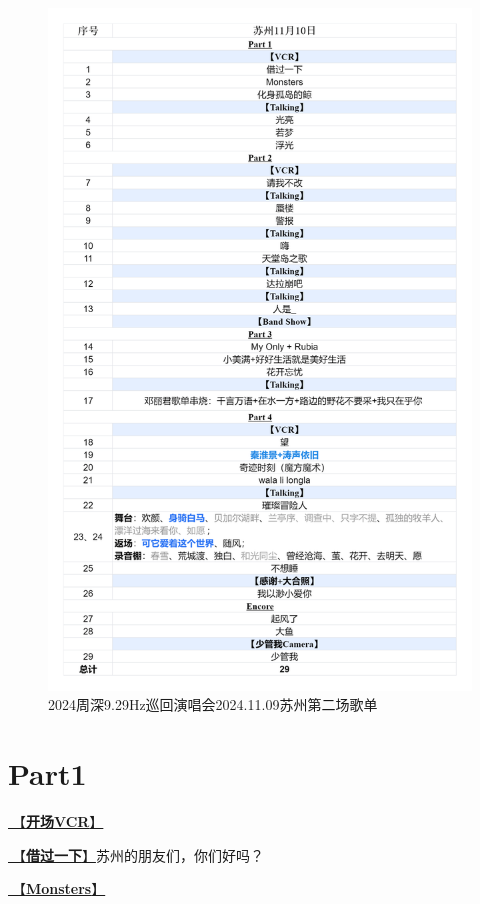 \documentclass[]{ctexbook}
\begin{document}
\begin{figure}

{\centering \includegraphics[width=320pt]{img/playlists/playlists-suzhou-20241110} 

}

\caption{2024周深9.29Hz巡回演唱会2024.11.09苏州第二场歌单}\label{fig:unnamed-chunk-119}
\end{figure}

\newpage

\section{Part1}\label{suzhou-20241110-part1}

\hyperref[opening-vcr]{🎥【\textbf{开场VCR}】}

\hyperref[I-will-go-my-way]{🎵【\textbf{借过一下}】}苏州的朋友们，你们好吗？

\hyperref[Monsters]{🎵【\textbf{Monsters}】}
\end{document}
